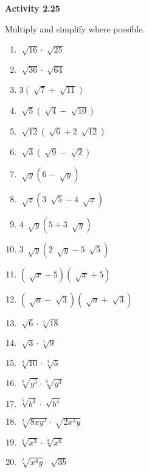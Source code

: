 \vspace{0.3ex}
\noindent\textbf{Activity 2.25}

\vspace{0.2ex}

Multiply and simplify where possible.

\begin{multicols}{2}
\begin{enumerate}[noitemsep, label = \color{blue}\arabic*. ]
    \item \(\sqrt[]{16} \cdot \sqrt[]{25}\)
    \item \(\sqrt[]{36} \cdot \sqrt[]{64}\)
    \item \(3 (\sqrt[]{7} + \sqrt[]{11})\)
    \item \(\sqrt[]{5} (\sqrt[]{4} - \sqrt[]{10})\)
    \item \(\sqrt[]{12} (\sqrt[]{6} + 2~\sqrt[]{12})\)
    \item \(\sqrt[]{3} (\sqrt[]{9} - \sqrt[]{2})\)
    \item \(\sqrt[]{y}(6 - \sqrt[]{y})\)
    \item \(\sqrt[]{z}(3~\sqrt[]{5} - 4~\sqrt[]{x})\)
    \item \(4~\sqrt[]{y}(5 + 3~\sqrt[]{y})\)
    \item \(3~\sqrt[]{y}(2~\sqrt[]{y} - 5~\sqrt[]{5})\)
\item \(\left( \sqrt[]{x} - 5 \right)\left( \sqrt[]{x} + 5 \right)\)
\item \(\left( \sqrt[]{a} - \sqrt[]{3}\right)\left( \sqrt[]{a} + \sqrt[]{3} \right)\)
    \item \(\sqrt[]{6} \cdot \sqrt[{\scriptstyle 3}]{18}\)
    \item \(\sqrt[]{3} \cdot \sqrt[{\scriptstyle 3}]{9}\)
    \item \(\sqrt[{\scriptstyle 4}]{10} \cdot \sqrt[{\scriptstyle 3}]{5}\)
    \item \(\sqrt[{\scriptstyle 4}]{y^{5}} \cdot \sqrt[{\scriptstyle 5}]{y^{3}}\)
    \item \(\sqrt[{\scriptstyle 5}]{b^{3}} \cdot \sqrt[]{b^{4}}\)
\item \(\sqrt[{\scriptstyle 3}]{8xy^{2}} \cdot \sqrt[]{2x^{3}y}\)
\item \(\sqrt[{\scriptstyle 4}]{x^{3}} \cdot \sqrt[{\scriptstyle 3}]{x^{6}}\)
\item \(\sqrt[{\scriptstyle 2}]{x^{4}y} \cdot \sqrt[]{3b}\)
    \end{enumerate}
\end{multicols}


